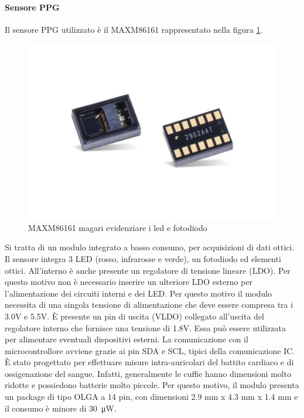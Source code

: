 \paragraph{Sensore PPG} Il sensore PPG utilizzato è il MAXM86161 rappresentato nella figura \ref{fig:ImmagineMAXM86161}.
\begin{figure}[tb]
	\centering
	\includegraphics[width=0.8\linewidth]{ImageFiles/Hardware/ImmagineMAXM86161}
	\caption{MAXM86161 magari evidenziare i led e fotodiodo}
	\label{fig:ImmagineMAXM86161}
\end{figure}
Si tratta di un modulo integrato a basso consumo, per acquisizioni di dati ottici. Il sensore integra 3 LED (rosso, infrarosse e verde), un fotodiodo ed elementi ottici. All'interno è anche presente un regolatore di tensione lineare (LDO). Per questo motivo non è necessario inserire un ulteriore LDO esterno per l'alimentazione dei circuiti interni e dei LED. Per questo motivo il modulo necessita di una singola tensione di alimentazione che deve essere compresa tra i 3.0V e 5.5V. \`E presente un pin di uscita (VLDO) collegato all'uscita del regolatore interno che fornisce una tensione di 1.8V. Essa può essere utilizzata per alimentare eventuali dispositivi esterni. La comunicazione con il microcontrollore avviene grazie ai pin SDA e SCL, tipici della comunicazione IC. \`E stato progettato per effettuare misure intra-auricolari del battito cardiaco e di ossigenazione del sangue. Infatti, generalmente le cuffie hanno dimensioni molto ridotte e possiedono batterie molto piccole. Per questo motivo, il modulo presenta un package di tipo OLGA a 14 pin, con dimensioni 2.9 mm x 4.3 mm x 1.4 mm e il consumo è minore di \SI{30}{\micro\watt}.

